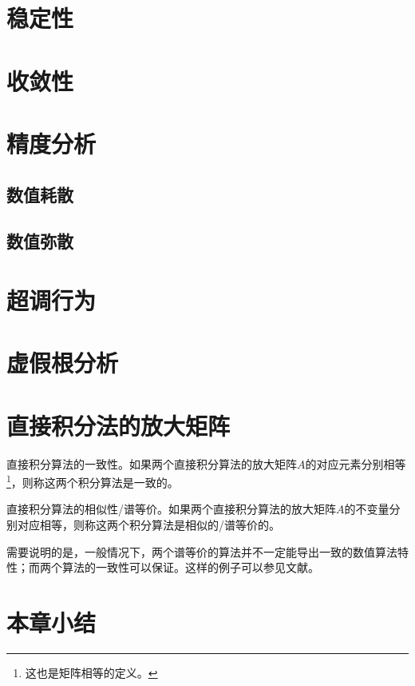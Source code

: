 \section{稳定性}

\section{收敛性}

\section{精度分析}

\subsection{数值耗散}

\subsection{数值弥散}

\section{超调行为}

\section{虚假根分析}

\section{直接积分法的放大矩阵}

\begin{definition}
直接积分算法的一致性\cite{Hoff1988}。如果两个直接积分算法的放大矩阵$A$的对应元素分别相等\footnote{这也是矩阵相等的定义。}，则称这两个积分算法是一致的。
\end{definition}

\begin{definition}
直接积分算法的相似性/谱等价\cite{Hoff1988}。如果两个直接积分算法的放大矩阵$A$的不变量分别对应相等，则称这两个积分算法是相似的/谱等价的。
\end{definition}

需要说明的是，一般情况下，两个谱等价的算法并不一定能导出一致的数值算法特性；而两个算法的一致性可以保证。这样的例子可以参见文献。

\section{本章小结}



